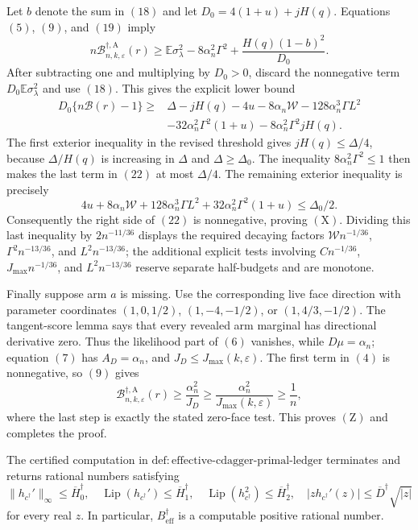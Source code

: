 Let \(b\) denote the sum in \((18)\) and let
\(D_0=4(1+u)+jH(q)\).  Equations \((5)\), \((9)\), and \((19)\) imply
\[
n\mathcal B_{n,k,\varepsilon}^{\dagger,\mathrm A}(r)
\ge \mathbb E\sigma_\lambda^2
-8\alpha_n^2\Gamma^2+\frac{H(q)(1-b)^2}{D_0}.
\tag{21}
\]
After subtracting one and multiplying by \(D_0>0\), discard the nonnegative term
\(D_0\mathbb E\sigma_\lambda^2\) and use \((18)\).  This gives the explicit lower bound
\[
\begin{aligned}
D_0\{n\mathcal B(r)-1\}
\ge{}&\Delta-jH(q)-4u-8\alpha_n\mathcal W
-128\alpha_n^3\Gamma L^2\\
&-32\alpha_n^2\Gamma^2(1+u)
-8\alpha_n^2\Gamma^2jH(q).
\end{aligned}
\tag{22}
\]
The first exterior inequality in the revised threshold gives
\(jH(q)\le\Delta/4\), because \(\Delta/H(q)\) is increasing in \(\Delta\) and \(\Delta\ge\Delta_0\).  The inequality
\(8\alpha_n^2\Gamma^2\le1\) then makes the last term in \((22)\) at most \(\Delta/4\).  The remaining exterior inequality is precisely
\[
4u+8\alpha_n\mathcal W+128\alpha_n^3\Gamma L^2
+32\alpha_n^2\Gamma^2(1+u)\le\Delta_0/2.
\]
Consequently the right side of \((22)\) is nonnegative, proving \((\mathrm X)\).  Dividing this last inequality by
\(2n^{-11/36}\) displays the required decaying factors
\(\mathcal Wn^{-1/36}\), \(\Gamma^2n^{-13/36}\), and
\(L^2n^{-13/36}\); the additional explicit tests involving
\(C n^{-1/36}\), \(J_{\max}n^{-1/36}\), and
\(L^2n^{-13/36}\) reserve separate half-budgets and are monotone.

Finally suppose arm \(a\) is missing.  Use the corresponding live face direction with parameter coordinates
\((1,0,1/2)\), \((1,-4,-1/2)\), or \((1,4/3,-1/2)\).
The tangent-score lemma says that every revealed arm marginal has directional derivative zero.  Thus the likelihood part of \((6)\) vanishes, while \(D\mu=\alpha_n\); equation \((7)\) has \(A_D=\alpha_n\), and \(J_D\le J_{\max}(k,\varepsilon)\).  The first term in \((4)\) is nonnegative, so \((9)\) gives
\[
\mathcal B_{n,k,\varepsilon}^{\dagger,\mathrm A}(r)
\ge\frac{\alpha_n^2}{J_D}
\ge\frac{\alpha_n^2}{J_{\max}(k,\varepsilon)}\ge\frac1n,
\]
where the last step is exactly the stated zero-face test.  This proves \((\mathrm Z)\) and completes the proof.

The certified computation in
\(\mathrm{def:effective\text{-}cdagger\text{-}primal\text{-}ledger}\) terminates and returns rational numbers satisfying
\[
\|h_{c^\dagger}'\|_\infty\le\overline H_0^\dagger,
\quad
\operatorname{Lip}(h_{c^\dagger}')\le\overline H_1^\dagger,
\quad
\operatorname{Lip}(h_{c^\dagger}^2)\le\overline H_2^\dagger,
\quad
|zh_{c^\dagger}'(z)|\le\overline D^\dagger\sqrt{|z|}
\]
for every real \(z\).  In particular, \(B_{\mathrm{eff}}^\dagger\) is a computable positive rational number.

